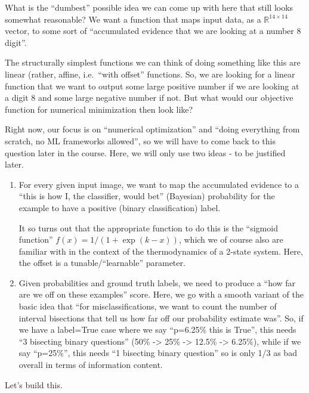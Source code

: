 \documentclass[11pt]{article}
\begin{document}
What is the ``dumbest'' possible idea we can come up with here that
still looks somewhat reasonable? We want a function that maps input
data, as a \({\mathbb R}^{14\times 14}\) vector, to some sort of
``accumulated evidence that we are looking at a number 8 digit''.

The structurally simplest functions we can think of doing something like
this are linear (rather, affine, i.e.~``with offset'' functions. So, we
are looking for a linear function that we want to output some large
positive number if we are looking at a digit 8 and some large negative
number if not. But what would our objective function for numerical
minimization then look like?

Right now, our focus is on ``numerical optimization'' and ``doing
everything from scratch, no ML frameworks allowed'', so we will have to
come back to this question later in the course. Here, we will only use
two ideas - to be justified later.

\begin{enumerate}
\def\labelenumi{\arabic{enumi}.}
\item
  For every given input image, we want to map the accumulated evidence
  to a ``this is how I, the classifier, would bet'' (Bayesian)
  probability for the example to have a positive (binary classification)
  label.

  It so turns out that the appropriate function to do this is the
  ``sigmoid function'' \(f(x)=1/(1+\exp(k-x))\), which we of course also
  are familiar with in the context of the thermodynamics of a 2-state
  system. Here, the offset is a tunable/``learnable'' parameter.
\item
  Given probabilities and ground truth labels, we need to produce a
  ``how far are we off on these examples'' score. Here, we go with a
  smooth variant of the basic idea that ``for misclassifications, we
  want to count the number of interval bisections that tell us how far
  off our probability estimate was''. So, if we have a label=True case
  where we say ``p=6.25\% this is True'', this needs ``3 bisecting
  binary questions'' (50\% -\textgreater{} 25\% -\textgreater{} 12.5\%
  -\textgreater{} 6.25\%), while if we say ``p=25\%'', this needs ``1
  bisecting binary question'' so is only 1/3 as bad overall in terms of
  information content.
\end{enumerate}

Let's build this.
\end{document}
